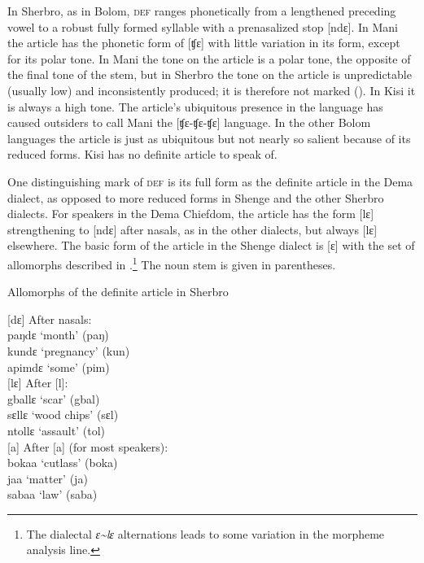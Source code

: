 In Sherbro, as in Bolom, \textsc{def} ranges phonetically from a lengthened preceding vowel to a robust fully formed syllable with a prenasalized stop [ndɛ]. In Mani the article has the phonetic form of [ʧɛ] with little variation in its form, except for its polar tone. In Mani the tone on the article is a polar tone, the opposite of the final tone of the stem, but in Sherbro the tone on the article is unpredictable (usually low) and inconsistently produced; it is therefore not marked  (\citealt{Childs2011}). In Kisi it is always a high tone. The article's ubiquitous presence in the language has caused outsiders to call Mani the [ʧɛ-ʧɛ{}-ʧɛ] language. In the other Bolom languages the article is just as ubiquitous but not nearly so salient because of its reduced forms. Kisi has no definite article to speak of.

One distinguishing mark of \textsc{def} is its full form as the definite article in the Dema dialect, as opposed to more reduced forms in Shenge and the other Sherbro dialects. For speakers in the Dema Chiefdom, the article has the form [lɛ] strengthening to [ndɛ] after nasals, as in the other dialects, but always [lɛ] elsewhere. The basic form of the article in the Shenge dialect is [ɛ] with the set of allomorphs described in .\footnote{The dialectal \textit{ɛ{\textasciitilde}lɛ} alternations leads to some variation in the morpheme analysis line.} The noun stem is given in parentheses.

\TabPositions{1cm,4cm}

\ea%
\label{ex:71}
Allomorphs of the definite article in Sherbro

[dɛ] After nasals:\\
\tab paŋdɛ ‘month' (paŋ)\\
\tab kundɛ ‘pregnancy' (kun)\\
\tab apimdɛ ‘some' (pim)\\

[lɛ] After [l]:\\
\tab gballɛ ‘scar' (gbal)\\
\tab sɛllɛ ‘wood chips' (sɛl)\\
\tab ntollɛ ‘assault' (tol)\\

[a] After [a] (for most speakers):\\
\tab bokaa ‘cutlass' (boka)\\
\tab jaa ‘matter' (ja)\\
\tab sabaa ‘law' (saba)\\

